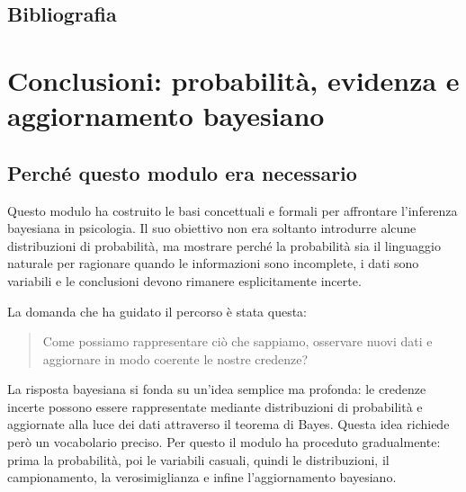 \documentclass[
  italian,
  letterpaper,
  a4paper,
  11pt,
  open=any]{scrbook}
\theoremstyle{plain}
\theoremstyle{definition}
\theoremstyle{definition}
\theoremstyle{remark}
\begin{document}
\section*{Bibliografia}\label{bibliografia-9}


\chapter{Conclusioni: probabilità, evidenza e aggiornamento
bayesiano}\label{sec-conclusioni}

\section*{Perché questo modulo era
necessario}\label{perchuxe9-questo-modulo-era-necessario}


Questo modulo ha costruito le basi concettuali e formali per affrontare
l'inferenza bayesiana in psicologia. Il suo obiettivo non era soltanto
introdurre alcune distribuzioni di probabilità, ma mostrare perché la
probabilità sia il linguaggio naturale per ragionare quando le
informazioni sono incomplete, i dati sono variabili e le conclusioni
devono rimanere esplicitamente incerte.

La domanda che ha guidato il percorso è stata questa:

\begin{quote}
Come possiamo rappresentare ciò che sappiamo, osservare nuovi dati e
aggiornare in modo coerente le nostre credenze?
\end{quote}

La risposta bayesiana si fonda su un'idea semplice ma profonda: le
credenze incerte possono essere rappresentate mediante distribuzioni di
probabilità e aggiornate alla luce dei dati attraverso il teorema di
Bayes. Questa idea richiede però un vocabolario preciso. Per questo il
modulo ha proceduto gradualmente: prima la probabilità, poi le variabili
casuali, quindi le distribuzioni, il campionamento, la verosimiglianza e
infine l'aggiornamento bayesiano.
\end{document}
